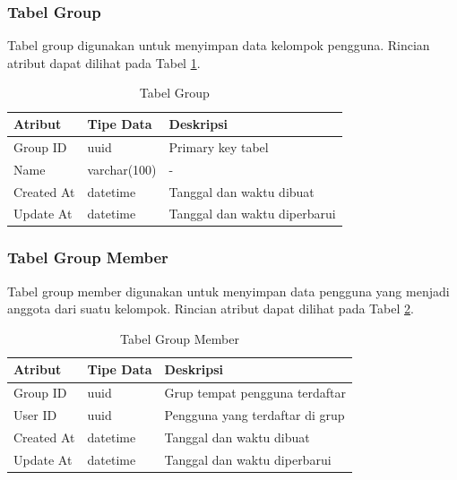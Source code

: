 \subsubsection{Tabel Group}
\par Tabel group digunakan untuk menyimpan data kelompok pengguna. Rincian atribut dapat dilihat pada Tabel \ref{tabel_group}.
\begin{longtable}{|p{2cm}|p{2.5cm}|p{4.5cm}|}
	\caption{Tabel Group} \label{tabel_group} \\ \hline
    \textbf{Atribut} & \textbf{Tipe Data} & \textbf{Deskripsi} \\ \hline
    Group ID & uuid & Primary key tabel \\ \hline
    Name & varchar(100) & - \\ \hline
    Created At & datetime & Tanggal dan waktu dibuat \\ \hline
    Update At & datetime & Tanggal dan waktu diperbarui \\ \hline
\end{longtable}

\subsubsection{Tabel Group Member}
\par Tabel group member digunakan untuk menyimpan data pengguna yang menjadi anggota dari suatu kelompok. Rincian atribut dapat dilihat pada Tabel \ref{tabel_group_member}.
\begin{longtable}{|p{2cm}|p{2.5cm}|p{4.5cm}|}
	\caption{Tabel Group Member} \label{tabel_group_member} \\ \hline
    \textbf{Atribut} & \textbf{Tipe Data} & \textbf{Deskripsi} \\ \hline
    Group ID & uuid & Grup tempat pengguna terdaftar \\ \hline
    User ID & uuid & Pengguna yang terdaftar di grup \\ \hline
    Created At & datetime & Tanggal dan waktu dibuat \\ \hline
    Update At & datetime & Tanggal dan waktu diperbarui \\ \hline
\end{longtable}

